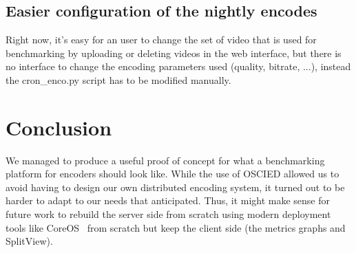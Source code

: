 \documentclass[a4paper,12pt]{article}
\begin{document}
\subsection{Easier configuration of the nightly encodes}
Right now, it's easy for an user to change the set of video that is used for
benchmarking by uploading or deleting videos in the web interface, but there is
no interface to change the encoding parameters used (quality, bitrate, ...),
instead the cron\_enco.py script has to be modified manually.

\section{Conclusion}
We managed to produce a useful proof of concept for what a benchmarking platform
for encoders should look like. While the use of OSCIED allowed us to avoid
having to design our own distributed encoding system, it turned out to be harder
to adapt to our needs that anticipated. Thus, it might make sense for future
work to rebuild the server side from scratch using modern deployment tools like
CoreOS~\cite{coreos} from scratch but keep the client side (the metrics graphs and SplitView).
\appendix
{}

\end{document}
